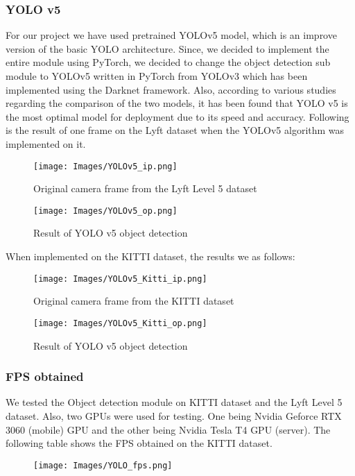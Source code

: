 \documentclass[conference]{IEEEtran}
\begin{document}
\subsubsection{\textbf{YOLO v5}}
For our project we have used pretrained YOLOv5 model, which is an improve version of the basic YOLO architecture. Since, we decided to implement the entire module using PyTorch, we decided to change the object detection sub module to YOLOv5 written in PyTorch from YOLOv3 which has been implemented using the Darknet framework. Also, according to various studies \cite{YOLOv5comparision} regarding the comparison of the two models, it has been found that YOLO v5 is the most optimal model for deployment due to its speed and accuracy.
Following is the result of one frame on the Lyft dataset when the YOLOv5 algorithm was implemented on it.

\begin{figure}[H]
  \centering
  \texttt{[image: Images/YOLOv5\_ip.png]}
  \caption{Original camera frame from the Lyft Level 5 dataset}
\end{figure}

\begin{figure}[H]
  \centering
  \texttt{[image: Images/YOLOv5\_op.png]}
  \caption{Result of YOLO v5 object detection}
\end{figure}

When implemented on the KITTI dataset, the results we as follows:
\begin{figure}[H]
  \centering
  \texttt{[image: Images/YOLOv5\_Kitti\_ip.png]}
  \caption{Original camera frame from the KITTI dataset}

\end{figure}

\begin{figure}[H]
  \centering
  \texttt{[image: Images/YOLOv5\_Kitti\_op.png]}
  \caption{Result of YOLO v5 object detection}
\end{figure}

\subsubsection*{\textbf{FPS obtained}}
We tested the Object detection module on KITTI dataset and the Lyft Level 5 dataset. Also, two GPUs were used for testing. One being Nvidia Geforce RTX 3060 (mobile) GPU and the other being Nvidia Tesla T4 GPU (server). The following table shows the FPS obtained on the KITTI dataset.
\begin{figure}[H]
  \centering
  \texttt{[image: Images/YOLO\_fps.png]}
\end{figure}
\end{document}
